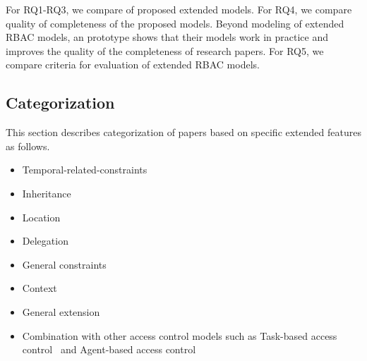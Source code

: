 For RQ1-RQ3, we compare of proposed extended models.
For RQ4, we compare quality of completeness of the proposed models.
Beyond modeling of extended RBAC models, an prototype shows that their models work in practice and improves the quality
of the completeness of research papers. For RQ5, we compare criteria for evaluation of extended RBAC models.

\subsection{Categorization} \label{subsec:categorization}

This section describes categorization of papers based on specific extended features as follows. 
\begin{itemize}
	\item Temporal-related-constraints~\cite{mossakowski03:temporal,aich07:STARBAC,kumar06:strbac,samuel07:spatio-temporal,ray07:spatio,chandran05:llt,aich09:role,bertino01:trbac, li08:fine, joshi05:generalized, chen08:spatio-temporal}
	\item Inheritance~\cite{ren10:machine}
	\item Location~\cite{chandran05:llt}
	\item Delegation~\cite{hasebe10:capability}
	\item General constraints~\cite{alam06:constraint,yao08:task}
	\item Context~\cite{tzelepi01:flexible,haibo05:context,cholewka00:acontext-sensitive,huang06:pervasive,motta03:contextual,bao08:role}						
	\item General extension~\cite{han08:extended,zhang06:collaborative}
	\item Combination with other access control models such as Task-based access control~\cite{yao08:task,oh03:task,zhou07:network, oh00:task} and Agent-based access control~\cite{yamazaki04:designing}
\end{itemize}


